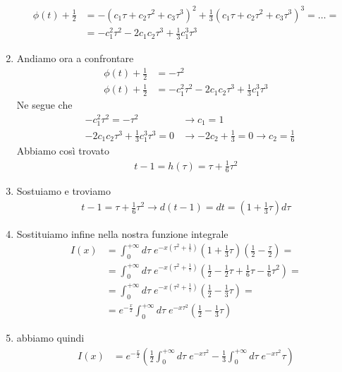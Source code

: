 \begin{enumerate}
	\begin{align}
		\phi(t) + \frac{1}{2} &=  - (c_1 \tau + c_2 \tau^2 + c_3 \tau^3)^2+ \frac{1}{3} (c_1 \tau + c_2 \tau^2 + c_3 \tau^3)^3 = \dots = \nonumber\\
		&= -c_1^2 \tau^2 - 2c_1c_2 \tau^3 + \frac{1}{3}c_1^3 \tau^3
	\end{align}
	\item Andiamo ora a confrontare
	\begin{align}
		\phi(t) + \frac{1}{2} &= -\tau^2\\
		\phi(t) + \frac{1}{2} &= -c_1^2 \tau^2 - 2c_1c_2 \tau^3 + \frac{1}{3}c_1^3 \tau^3
	\end{align}
	Ne segue che
	\begin{align}
		&-c_1^2 \tau^2 = -\tau^2 &\to c_1 = 1\\
		&-2c_1c_2 \tau^3 + \frac{1}{3}c_1^3 \tau^3=0 &\to -2c_2 + \frac{1}{3} = 0 \to c_2 = \frac{1}{6}
	\end{align}
	Abbiamo così trovato
	\begin{align}
		t-1 = h(\tau) = \tau + \frac{1}{6}\tau^2
	\end{align}
	\item Sostuiamo e troviamo
	\begin{align}
		t-1 = \tau + \frac{1}{6}\tau^2 \to d(t-1) = dt = \left( 1 + \frac{1}{3} \tau \right) d\tau
	\end{align}
	\item Sostituiamo infine nella nostra funzione integrale
	\begin{align}
		I(x) &= \int_{0}^{+\infty} d\tau \; e^{-x \left( \tau^2 + \frac{1}{\tau} \right)} \left( 1 + \frac{1}{3} \tau \right) \left(\frac{1}{2} - \frac{\tau}{2}\right) = \nonumber\\
		&= \int_{0}^{+\infty} d\tau \; e^{-x \left( \tau^2 + \frac{1}{\tau} \right)} \left( \frac{1}{2}- \frac{1}{2}\tau + \frac{1}{6} \tau - \frac{1}{6} \tau^2 \right) = \nonumber\\
		&= \int_{0}^{+\infty} d\tau \; e^{-x \left( \tau^2 + \frac{1}{\tau} \right)} \left( \frac{1}{2} - \frac{1}{3} \tau \right) = \nonumber\\
		&= e^{-\frac{x}{2}}\int_{0}^{+\infty} d\tau \; e^{-x\tau^2} \left( \frac{1}{2} - \frac{1}{3} \tau \right)
	\end{align}
	\item abbiamo quindi
	\begin{align}
		I(x) &= e^{-\frac{x}{2}} \left( \frac{1}{2} \int_{0}^{+\infty} d\tau \; e^{-x\tau^2} - \frac{1}{3} \int_{0}^{+\infty} d\tau \; e^{-x\tau^2}\tau \right)
	\end{align}
\end{enumerate}

